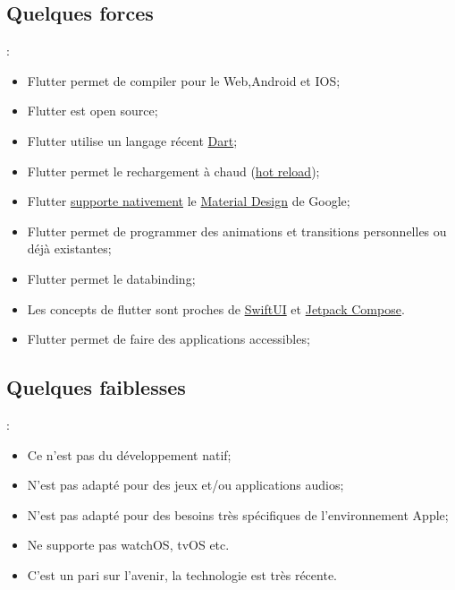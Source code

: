 \documentclass[10pt]{beamer}
\begin{document}
\subsection{Quelques forces}
\begin{frame}[fragile,t]{\secname : \subsecname}
    \begin{itemize}
        \item Flutter permet de compiler pour le Web,Android et IOS;
        \item Flutter est open source;
        \item Flutter utilise un langage récent \href{https://dart.dev}{Dart};
        \item Flutter permet le rechargement à chaud (\href{https://flutter.dev/docs/development/tools/hot-reload}{hot reload});
        \item Flutter \href{https://flutter.dev/docs/development/ui/widgets/material}{supporte nativement} le \href{https://material.io/design/guidelines-overview}{Material Design} de Google;
        \item Flutter permet de programmer des animations et transitions personnelles ou déjà existantes;
        \item Flutter permet le databinding;
        \item Les concepts de flutter sont proches de \href{https://developer.apple.com/xcode/swiftui/}{SwiftUI} et \href{https://developer.android.com/jetpack/compose}{Jetpack Compose}.
        \item Flutter permet de faire des applications accessibles;
    \end{itemize}
\end{frame}

\subsection{Quelques faiblesses}
\begin{frame}[fragile,t]{\secname : \subsecname}
    \begin{itemize}
        \item Ce n'est pas du développement natif;
        \item N'est pas adapté pour des jeux et/ou applications audios;
        \item N'est pas adapté pour des besoins très spécifiques de l'environnement Apple;
        \item Ne supporte pas watchOS, tvOS etc.
        \item C'est un pari sur l'avenir, la technologie est très récente.
    \end{itemize}
\end{frame}
\end{document}
